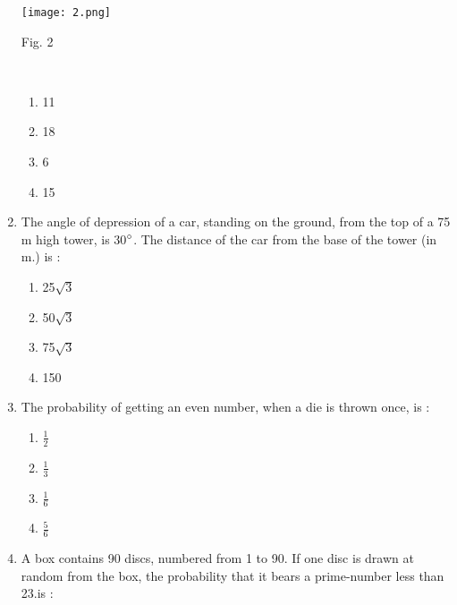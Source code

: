 \documentclass[journal,12pt,twocolumn]{IEEEtran}
\renewcommand\thesection{\arabic{section}}
\begin{document}
\begin{enumerate}[label=\thesection.\arabic*.,ref=\thesection.\theenumi]
\texttt{[image: 2.png]}\\{\centering
\caption{Fig. 2}\\}
\label{fig2}
 \begin{enumerate}[A]
    \item 11\\
    \item 18\\
    \item 6\\
    \item 15
 \end{enumerate}
\item The angle of depression of a car, standing on the ground, from the top of a
75 m high tower, is 30$\degree$. The distance of the car from the base of the tower
(in m.) is : \\
 \begin{enumerate}[A]
    \item 25$\sqrt{3}$\\
    \item 50$\sqrt{3}$\\
    \item 75$\sqrt{3}$\\
    \item 150
 \end{enumerate}
\item  The probability of getting an even number, when a die is thrown once, is :

 \begin{enumerate}[A]
    \item $\frac{1}{2}$\\
    \item $\frac{1}{3}$\\
    \item $\frac{1}{6}$\\
    \item $\frac{5}{6}$
 \end{enumerate}
 \item A box contains 90 discs, numbered from 1 to 90. If one disc is drawn at random from the box, the probability that it bears a prime-number less than 23.is :
 

\end{enumerate}
\end{document}
